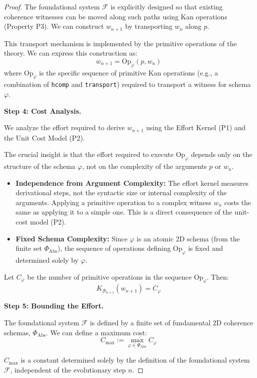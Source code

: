 \documentclass[11pt]{article}
\theoremstyle{definition}
\theoremstyle{remark}
\begin{document}
\begin{proof}
The foundational system $\mathcal{F}$ is explicitly designed so that existing coherence witnesses can be
moved along such paths using Kan operations (Property P3). We can construct $w_{n+1}$ by transporting
$w_n$ along $p$.

This transport mechanism is implemented by the primitive operations of the theory. We can express
this construction as:
\[
w_{n+1} = \text{Op}_\varphi(p, w_n)
\]
where $\text{Op}_\varphi$ is the specific sequence of primitive Kan operations (e.g., a combination of \texttt{hcomp}
and \texttt{transport}) required to transport a witness for schema $\varphi$.

\textbf{Step 4: Cost Analysis.}

We analyze the effort required to derive $w_{n+1}$ using the Effort Kernel (P1) and the Unit Cost
Model (P2).

The crucial insight is that the effort required to execute $\text{Op}_\varphi$ depends only on the structure
of the schema $\varphi$, not on the complexity of the arguments $p$ or $w_n$.

\begin{itemize}
\item \textbf{Independence from Argument Complexity:} The effort kernel measures derivational
steps, not the syntactic size or internal complexity of the arguments. Applying a primitive operation
to a complex witness $w_n$ costs the same as applying it to a simple one. This is a direct consequence
of the unit-cost model (P2).

\item \textbf{Fixed Schema Complexity:} Since $\varphi$ is an atomic 2D schema (from the finite set
$\Phi_{\text{Abs}}$), the sequence of operations defining $\text{Op}_\varphi$ is fixed and determined solely by $\varphi$.
\end{itemize}

Let $C_\varphi$ be the number of primitive operations in the sequence $\text{Op}_\varphi$. Then:
\[
K_{\mathcal{B}_{n+1}}(w_{n+1}) = C_\varphi
\]

\textbf{Step 5: Bounding the Effort.}

The foundational system $\mathcal{F}$ is defined by a finite set of fundamental 2D coherence schemas,
$\Phi_{\text{Abs}}$. We can define a maximum cost:
\[
C_{\max} := \max_{\varphi \in \Phi_{\text{Abs}}} C_\varphi
\]

$C_{\max}$ is a constant determined solely by the definition of the foundational system $\mathcal{F}$, independent
of the evolutionary step $n$.


\end{proof}
\end{document}
